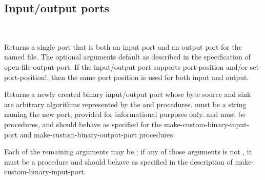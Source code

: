 \subsection{Input/output ports}

\begin{entry}{%
\\
}
   
Returns a single port that is both an input port and an
output port for the named file.
The optional arguments default as described in the specification
of {\cf open-file-output-port}.
If the input/output port supports {\cf port-position} and/or
{\cf set-port-position!}, then the same port position is used
for both input and output.
\end{entry}

\begin{entry}{%
}

Returns a newly created binary input/output port whose
byte source and sink are
arbitrary algorithms represented by the  and 
procedures.
 must be a string naming the new port,
provided for informational purposes only.
 and  must be procedures,
and should behave as specified for the
{\cf make-custom-binary-input-port} and
{\cf make-custom-binary-output-port} procedures.

Each of the remaining arguments may be \schfalse{}; if any of
those arguments is not \schfalse{}, it must be a procedure and
should behave as specified in the description of
{\cf make-custom-binary-input-port}.
\end{entry}


